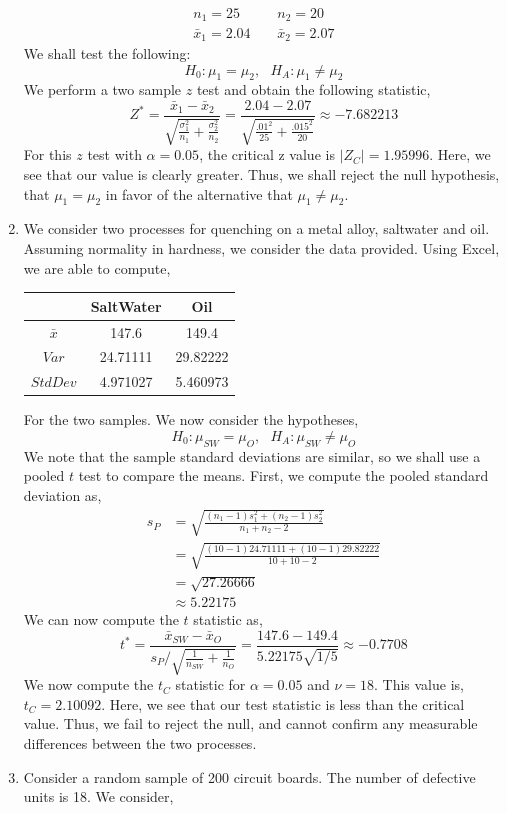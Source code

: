 \documentclass[letterpaper,10pt]{article}
\begin{document}
\begin{enumerate}
\begin{align*}
n_1=25\ \ \ \ \ &n_2=20\\
\bar{x}_1=2.04\ \ \ \ \ &\bar{x}_2=2.07
\end{align*}
We shall test the following:
\[H_0: \mu_1=\mu_2,\ \ \ H_A: \mu_1 \neq \mu_2\]
We perform a two sample $z$ test and obtain the following statistic,
\[Z^*=\frac{\bar{x}_1-\bar{x}_2}{\sqrt{\frac{\sigma_1^2}{n_1}+\frac{\sigma_2^2}{n_2}}}=\frac{2.04-2.07}{\sqrt{\frac{.01^2}{25}+\frac{.015^2}{20}}}\approx -7.682213\]
For this $z$ test with $\alpha=0.05$, the critical z value is $|Z_C|=1.95996$. Here, we see that our value is clearly greater. Thus, we shall reject the null hypothesis, that $\mu_1=\mu_2$ in favor of the alternative that $\mu_1\neq \mu_2$.
\item We consider two processes for quenching on a metal alloy, saltwater and oil. Assuming normality in hardness, we consider the data provided. Using Excel, we are able to compute,
\begin{center}
\begin{tabular}{|c||c|c|}
\hline
& SaltWater & Oil \\\hline
$\bar{x}$ & 147.6 & 149.4\\\hline
$Var$ & 24.71111 & 29.82222\\\hline
$StdDev$ & 4.971027 & 5.460973\\\hline
\end{tabular}
\end{center}
For the two samples. We now consider the hypotheses,
\[H_0: \mu_{SW}=\mu_O,\ \ \ H_A: \mu_{SW} \neq \mu_O\]
We note that the sample standard deviations are similar, so we shall use a pooled $t$ test to compare the means. First, we compute the pooled standard deviation as,
\begin{align*}
s_P&=\sqrt{\frac{(n_1-1)s_1^2+(n_2-1)s_2^2}{n_1+n_2-2}}\\
&=\sqrt{\frac{(10-1)24.71111+(10-1)29.82222}{10+10-2}}\\
&=\sqrt{27.26666}\\
&\approx 5.22175
\end{align*}
We can now compute the $t$ statistic as,
\[t^*=\frac{\bar{x}_{SW}-\bar{x}_O}{s_P/\sqrt{\frac{1}{n_{SW}}+\frac{1}{n_O}}}=\frac{147.6-149.4}{5.22175\sqrt{1/5}}\approx -0.7708\]
We now compute the $t_C$ statistic for $\alpha=0.05$ and $\nu=18$. This value is,
$t_C=2.10092$. Here, we see that our test statistic is less than the critical value. Thus, we fail to reject the null, and cannot confirm any measurable differences between the two processes.
\item Consider a random sample of 200 circuit boards. The number of defective units is 18. We consider,

\end{enumerate}
\end{document}
